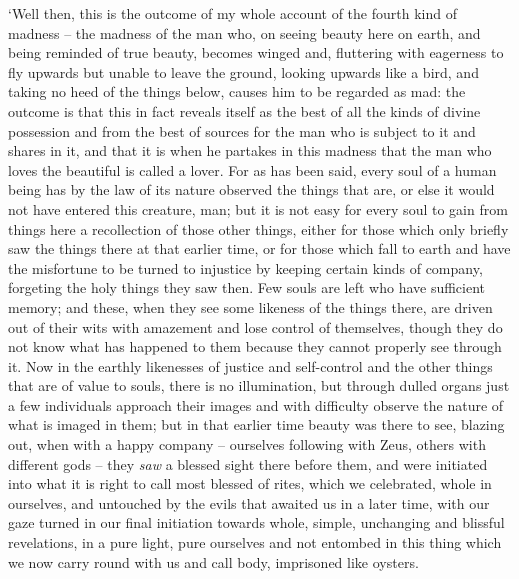 ‘Well then, this is the outcome of my whole account of the 
fourth kind of madness -- the madness of the man who, on seeing beauty
here on earth, and being reminded of true beauty, becomes winged and,
fluttering with eagerness to fly upwards but unable to leave the ground,
looking upwards like a bird, and taking no heed of the things below,
causes him to be  regarded as
mad: the outcome is that
this in fact reveals itself as the best of all the kinds of divine
possession and from the best of sources for the man who is subject to it
and shares in it, and that it is when he partakes in this madness that
the man who loves the
beautiful is called a
lover. For as has been said, every soul of a human being has by the law
of its nature  observed the things that are, or else it would
not have entered this creature, man; but it is not easy for every soul
to gain from things here a recollection of those other things, either
for those which only briefly saw the things there at that earlier time,
or for those which fall to earth and have the misfortune to be turned to
injustice by keeping certain kinds of company, forgeting  the
holy things they saw then. Few souls are left who have sufficient
memory; and these, when they see some likeness of the things there, are
driven out of their wits with amazement and lose control of themselves,
though they do not know what  has happened to them because they
cannot properly see through it. Now in the earthly likenesses of justice
and self-control and the other things that are of value to souls, there
is no illumination, but through dulled organs just a few individuals
approach their images and with difficulty observe the nature of what is
 imaged in them; but in that earlier time beauty was there to
see, blazing out, when with a happy company --
ourselves following with
Zeus, others with different gods -- they {\em saw} a blessed sight there
before them, and were initiated into what it is right to call most
blessed of rites, which we celebrated, whole  in ourselves, and
untouched by the evils that awaited us in a later time, with our gaze
turned in our final initiation towards whole, simple, unchanging and
blissful revelations, in a pure light, pure ourselves and not entombed
in this thing which we  now carry round with us and call body,
imprisoned like oysters.

